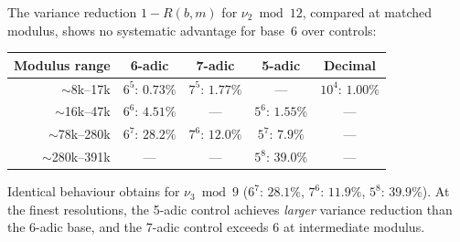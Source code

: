 \documentclass[11pt,a4paper]{article}
\theoremstyle{plain}
\theoremstyle{definition}
\begin{document}
\begin{empirical}
\label{obs:sixadic-modular}
    The variance reduction $1 - R(b,m)$ for $\nu_2 \bmod 12$,
    compared at matched modulus, shows no systematic advantage for
    base~$6$ over controls:
    \begin{center}
    \renewcommand{\arraystretch}{1.15}
    \begin{tabular}{rcccc}
        \toprule
        Modulus range & 6-adic & 7-adic & 5-adic & Decimal \\
        \midrule
        $\sim$8k--17k
            & $6^5$: $0.73\%$ & $7^5$: $1.77\%$ & --- & $10^4$: $1.00\%$ \\
        $\sim$16k--47k
            & $6^6$: $4.51\%$ & --- & $5^6$: $1.55\%$ & --- \\
        $\sim$78k--280k
            & $6^7$: $28.2\%$ & $7^6$: $12.0\%$ & $5^7$: $7.9\%$ & --- \\
        $\sim$280k--391k
            & --- & --- & $5^8$: $39.0\%$ & --- \\
        \bottomrule
    \end{tabular}
    \end{center}
    Identical behaviour obtains for $\nu_3 \bmod 9$
    ($6^7$: $28.1\%$, $7^6$: $11.9\%$, $5^8$: $39.9\%$).
    At the finest resolutions, the 5-adic control achieves
    \emph{larger} variance reduction than the 6-adic base, and
    the 7-adic control exceeds $6$ at intermediate modulus.
\end{empirical}
\end{document}
